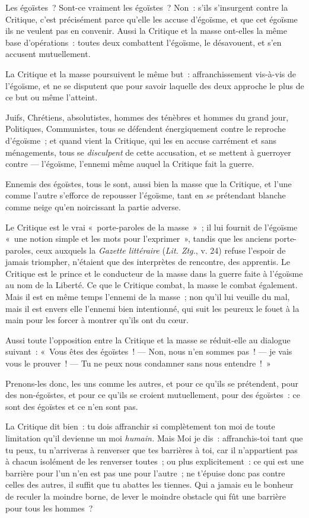 \documentclass[french,twoside]{book} %
\begin{document}
Les égoïstes ? Sont-ce vraiment les égoïstes ? Non : s’ils s’insurgent contre la Critique, c’est précisément parce qu’elle les accuse d’égoïsme, et que cet égoïsme ils ne veulent pas en convenir. Aussi la Critique et la masse ont-elles la même base d’opérations : toutes deux combattent l’égoïsme, le désavouent, et s’en accusent mutuellement.\par
La Critique et la masse poursuivent le même but : affranchissement vis-à-vis de l’égoïsme, et ne se disputent que pour savoir laquelle des deux approche le plus de ce but ou même l’atteint.\par
Juifs, Chrétiens, absolutistes, hommes des ténèbres et hommes du grand jour, Politiques, Communistes, tous se défendent énergiquement contre le reproche d’égoïsme ; et quand vient la Critique, qui les en accuse carrément et sans ménagements, tous se \emph{disculpent} de cette accusation, et se mettent à guerroyer  contre — l’égoïsme, l’ennemi même auquel la Critique fait la guerre.\par
Ennemis des égoïstes, tous le sont, aussi bien la masse que la Critique, et l’une comme l’autre s’efforce de repousser l’égoïsme, tant en \emph{se} prétendant blanche comme neige qu’en noircissant la partie adverse.\par
Le Critique est le vrai « porte-paroles de la masse » ; il lui fournit de l’égoïsme « une notion simple et les mots pour l’exprimer », tandis que les anciens porte-paroles, ceux auxquels la \emph{Gazette littéraire} (\emph{Lit. Ztg.}, v. 24) refuse l’espoir de jamais triompher, n’étaient que des interprètes de rencontre, des apprentis. Le Critique est le prince et le conducteur de la masse dans la guerre faite à l’égoïsme au nom de la Liberté. Ce que le Critique combat, la masse le combat également. Mais il est en même temps l’ennemi de la masse ; non qu’il lui veuille du mal, mais il est envers elle l’ennemi bien intentionné, qui suit les peureux le fouet à la main pour les forcer à montrer qu’ils ont du cœur.\par
Aussi toute l’opposition entre la Critique et la masse se réduit-elle au dialogue suivant : « Vous êtes des égoïstes ! — Non, nous n’en sommes pas ! — je vais vous le prouver ! — Tu ne peux nous condamner sans nous entendre ! »\par
Prenons-les donc, les uns comme les autres, et pour ce qu’ils se prétendent, pour des non-égoïstes, et pour ce qu’ils se croient mutuellement, pour des égoïstes : ce sont des égoïstes et ce n’en sont pas.\par
La Critique dit bien : tu dois affranchir si complètement ton moi de toute limitation qu’il devienne un moi \emph{humain.} Mais Moi je dis : affranchis-toi tant que tu peux, tu n’arriveras à renverser que tes barrières à toi, car il n’appartient pas à chacun isolément de les renverser toutes ; ou plus explicitement : ce qui est une barrière pour l’un n’en est pas une pour l’autre ; ne t’épuise donc pas contre celles des autres, il suffit que tu abattes les tiennes. Qui a jamais eu le bonheur  de reculer la moindre borne, de lever le moindre obstacle qui fût une barrière pour tous les hommes ?\par
\end{document}
